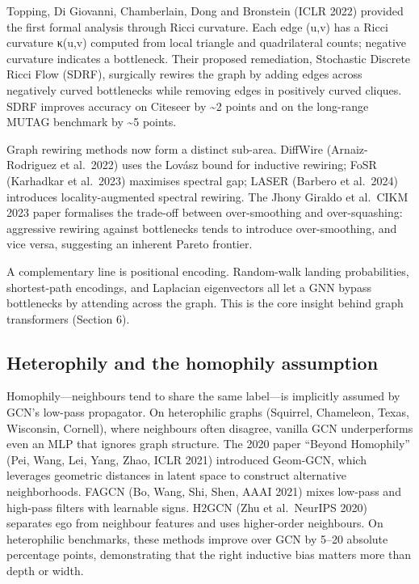 Topping, Di Giovanni, Chamberlain, Dong and Bronstein (ICLR 2022) provided the first formal analysis through Ricci curvature. Each edge (u,v) has a Ricci curvature κ(u,v) computed from local triangle and quadrilateral counts; negative curvature indicates a bottleneck. Their proposed remediation, Stochastic Discrete Ricci Flow (SDRF), surgically rewires the graph by adding edges across negatively curved bottlenecks while removing edges in positively curved cliques. SDRF improves accuracy on Citeseer by \textasciitilde2 points and on the long-range MUTAG benchmark by \textasciitilde5 points.

Graph rewiring methods now form a distinct sub-area. DiffWire (Arnaiz-Rodriguez et al.~2022) uses the Lovász bound for inductive rewiring; FoSR (Karhadkar et al.~2023) maximises spectral gap; LASER (Barbero et al.~2024) introduces locality-augmented spectral rewiring. The Jhony Giraldo et al.~CIKM 2023 paper formalises the trade-off between over-smoothing and over-squashing: aggressive rewiring against bottlenecks tends to introduce over-smoothing, and vice versa, suggesting an inherent Pareto frontier.

A complementary line is positional encoding. Random-walk landing probabilities, shortest-path encodings, and Laplacian eigenvectors all let a GNN bypass bottlenecks by attending across the graph. This is the core insight behind graph transformers (Section 6).

\subsection{Heterophily and the homophily assumption}\label{heterophily-and-the-homophily-assumption}

Homophily---neighbours tend to share the same label---is implicitly assumed by GCN's low-pass propagator. On heterophilic graphs (Squirrel, Chameleon, Texas, Wisconsin, Cornell), where neighbours often disagree, vanilla GCN underperforms even an MLP that ignores graph structure. The 2020 paper ``Beyond Homophily'' (Pei, Wang, Lei, Yang, Zhao, ICLR 2021) introduced Geom-GCN, which leverages geometric distances in latent space to construct alternative neighborhoods. FAGCN (Bo, Wang, Shi, Shen, AAAI 2021) mixes low-pass and high-pass filters with learnable signs. H2GCN (Zhu et al.~NeurIPS 2020) separates ego from neighbour features and uses higher-order neighbours. On heterophilic benchmarks, these methods improve over GCN by 5--20 absolute percentage points, demonstrating that the right inductive bias matters more than depth or width.

